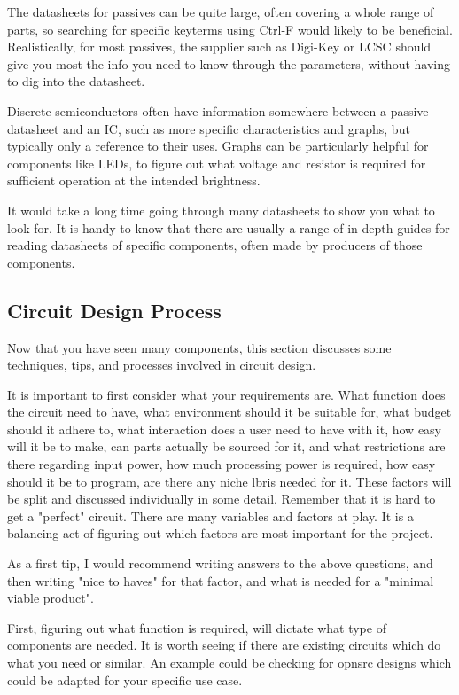 \documentclass[a4paper,11pt]{report}
\begin{document}
The datasheets for passives can be quite large, often covering a whole range of parts, so searching for specific keyterms using Ctrl-F would likely to be beneficial. Realistically, for most passives, the supplier such as Digi-Key or LCSC should give you most the info you need to know through the parameters, without having to dig into the datasheet.

Discrete semiconductors often have information somewhere between a passive datasheet and an IC, such as more specific characteristics and graphs, but typically only a reference to their uses. Graphs can be particularly helpful for components like LEDs, to figure out what voltage and resistor is required for sufficient operation at the intended brightness.

It would take a long time going through many datasheets to show you what to look for. It is handy to know that there are usually a range of in-depth guides for reading datasheets of specific components, often made by producers of those components.

\vspace*{1\baselineskip}

\subsection{Circuit Design Process}

Now that you have seen many components, this section discusses some techniques, tips, and processes involved in circuit design.

It is important to first consider what your requirements are. What function does the circuit need to have, what environment should it be suitable for, what budget should it adhere to, what interaction does a user need to have with it, how easy will it be to make, can parts actually be sourced for it, and what restrictions are there regarding input power, how much processing power is required, how easy should it be to program, are there any niche \gls{lbris} needed for it. These factors will be split and discussed individually in some detail. Remember that it is hard to get a "perfect" circuit. There are many variables and factors at play. It is a balancing act of figuring out which factors are most important for the project.

As a first tip, I would recommend writing answers to the above questions, and then writing "nice to haves" for that factor, and what is needed for a "minimal viable product".

First, figuring out what function is required, will dictate what type of components are needed. It is worth seeing if there are existing circuits which do what you need or similar. An example could be checking for \gls{opnsrc} designs which could be adapted for your specific use case.
\end{document}
